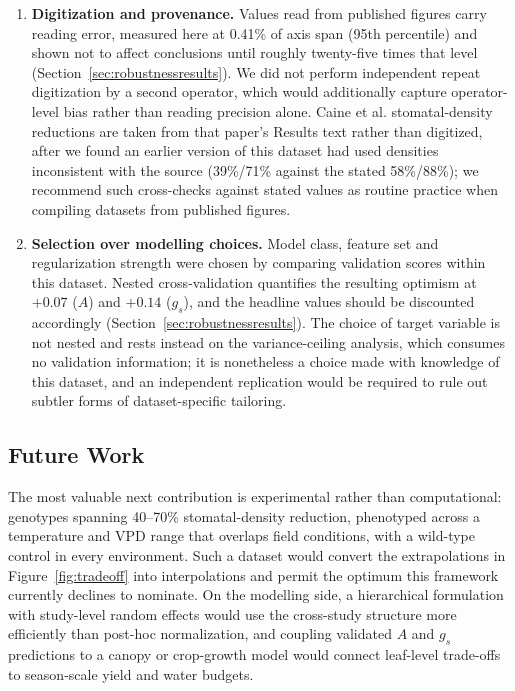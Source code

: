 \documentclass[runningheads]{llncs}
\begin{document}
\begin{enumerate}
    \item \textbf{Digitization and provenance.} Values read from published figures carry reading error, measured here at 0.41\% of axis span (95th percentile) and shown not to affect conclusions until roughly twenty-five times that level (Section~\ref{sec:robustnessresults}). We did not perform independent repeat digitization by a second operator, which would additionally capture operator-level bias rather than reading precision alone. Caine et al. stomatal-density reductions are taken from that paper's Results text rather than digitized, after we found an earlier version of this dataset had used densities inconsistent with the source (39\%/71\% against the stated 58\%/88\%); we recommend such cross-checks against stated values as routine practice when compiling datasets from published figures.
    \item \textbf{Selection over modelling choices.} Model class, feature set and regularization strength were chosen by comparing validation scores within this dataset. Nested cross-validation quantifies the resulting optimism at $+0.07$ ($A$) and $+0.14$ ($g_s$), and the headline values should be discounted accordingly (Section~\ref{sec:robustnessresults}). The choice of target variable is not nested and rests instead on the variance-ceiling analysis, which consumes no validation information; it is nonetheless a choice made with knowledge of this dataset, and an independent replication would be required to rule out subtler forms of dataset-specific tailoring.
\end{enumerate}

\subsection{Future Work}
The most valuable next contribution is experimental rather than computational: genotypes spanning 40--70\% stomatal-density reduction, phenotyped across a temperature and VPD range that overlaps field conditions, with a wild-type control in every environment. Such a dataset would convert the extrapolations in Figure~\ref{fig:tradeoff} into interpolations and permit the optimum this framework currently declines to nominate. On the modelling side, a hierarchical formulation with study-level random effects would use the cross-study structure more efficiently than post-hoc normalization, and coupling validated $A$ and $g_s$ predictions to a canopy or crop-growth model would connect leaf-level trade-offs to season-scale yield and water budgets.
\end{document}
